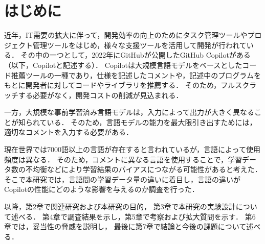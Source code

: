 \section{はじめに\label{intro}}
    近年，IT需要の拡大に伴って，開発効率の向上のためにタスク管理ツールやプロジェクト管理ツールをはじめ，様々な支援ツールを活用して開発が行われている．
    その中の一つとして，2022年にGitHubが公開したGitHub Copilotがある（以下，Copilotと記述する）．
    Copilotは大規模言語モデルをベースとしたコード推薦ツールの一種であり，仕様を記述したコメントや，記述中のプログラムをもとに開発者に対してコードやライブラリを推薦する．
    そのため，フルスクラッチする必要がなく，開発コストの削減が見込まれる．

    一方，大規模な事前学習済み言語モデルは，入力によって出力が大きく異なることが知られている\cite{Yao2022ACL}．
    そのため，言語モデルの能力を最大限引き出すためには，適切なコメントを入力する必要がある．
    
    現在世界では7000語以上の言語が存在する\cite{Ethnologue}と言われているが，言語によって使用頻度は異なる．
    そのため，コメントに異なる言語を使用することで，学習データ数の不均衡などにより学習結果のバイアスにつながる可能性があると考えた．
    そこで本研究では，言語間の学習データ量の違いに着目し，言語の違いがCopilotの性能にどのような影響を与えるのか調査を行った．

    以降，第2章で関連研究および本研究の目的，
    第3章で本研究の実験設計について述べる．
    第4章で調査結果を示し，第5章で考察および拡大質問を示す．
    第6章では，妥当性の脅威を説明し，
    最後に第7章で結論と今後の課題について述べる．
